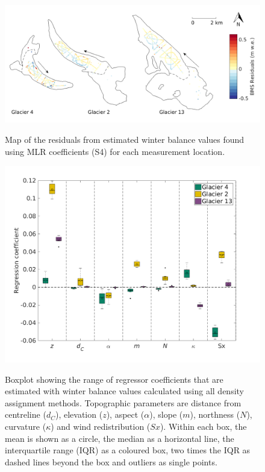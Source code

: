 \documentclass{sfuthesis}
\newcommand{\params}{Topographic parameters are distance from centreline ($d_C$), elevation ($z$), aspect ($\alpha$), slope ($m$), northness ($N$), curvature ($\kappa$) and wind redistribution ($Sx$). }
\newcommand{\boxplot}{Within each box, the mean is shown as a circle, the median as a horizontal line, the interquartile range (IQR) as a coloured box, two times the IQR as dashed lines beyond the box and outliers as single points. }
\begin{document}
\begin{figure}[H]
	\centering
	\includegraphics[width =\textwidth]{residualsMap_MLR.png}\\
	\caption{Map of the residuals from estimated winter balance values found using MLR coefficients (S4) for each measurement location.}
	\label{fig:MLR_residualsMap}
\end{figure} 

\begin{figure}[H]
	\centering
	\includegraphics[width =1\textwidth]{MLRcoeff_DensityOpts.png}\\
	\caption{Boxplot showing the range of regressor coefficients that are estimated with winter balance values calculated using all density assignment methods. \params \boxplot }
	\label{fig:MLRcoeff_densityOptions}
\end{figure}
\end{document}
